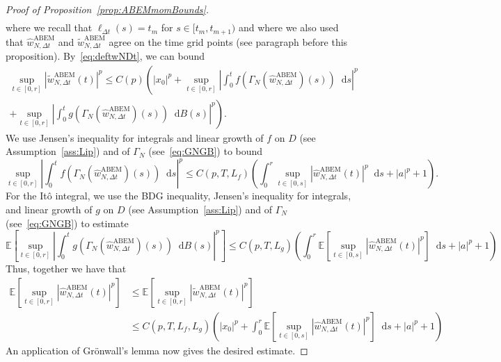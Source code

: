 \documentclass[11pt]{amsart}
\newcommand{\E}{{\mathbb E}}
\newcommand*\diff{\mathop{}\!\mathrm{d}}
\newcommand{\twNDt}{\tilde{w}_{N,\Delta t}}
\newcommand{\ABEM}{\textrm{ABEM}}
\begin{document}
{\begin{proof}[Proof of Proposition~\ref{prop:ABEMmomBounds}]
\begin{align*}
\end{align*}
where we recall that $\ell_{\Delta t}(s) = t_{m}$ for $s \in [t_{m},t_{m+1})$ and where we also used that $\hat{w}_{N,\Delta t}^{\ABEM}$ and $\tilde{w}^{\ABEM}_{N,\Delta t}$ agree on the time grid points (see paragraph before this proposition). By~\eqref{eq:deftwNDt}, we can bound 
\begin{multline*}
\sup_{t \in [0,r]} \left| \twNDt^{\ABEM}(t) \right|^{p} \leq C(p) \left( |x_{0}|^{p} + \sup_{t \in [0,r]} \left| \int_{0}^{t} f(\Gamma_{N}(\hat{w}_{N,\Delta t}^{\ABEM})(s)) \diff s \right|^{p} \right. \\ \left. + \sup_{t \in [0,r]} \left| \int_{0}^{t} g(\Gamma_{N}(\hat{w}_{N,\Delta t}^{\ABEM})(s)) \diff B(s) \right|^{p} \right).
\end{multline*}
We use Jensen's inequality for integrals and linear growth of $f$ on $D$ (see Assumption~\ref{ass:Lip}) and of $\Gamma_{N}$ (see~\eqref{eq:GNGB}) to bound
\begin{equation*}
\sup_{t \in [0,r]} \left| \int_{0}^{t} f(\Gamma_{N}(\hat{w}_{N,\Delta t}^{\ABEM})(s)) \diff s \right|^{p} \leq C(p,T,L_{f}) \left( \int_{0}^{r} \sup_{t \in [0,s]} \left| \hat{w}_{N,\Delta t}^{\ABEM}(t) \right|^{p} \diff s + |a|^{p} + 1 \right).
\end{equation*}
For the Itô integral, we use the BDG inequality, Jensen's inequality for integrals, and linear growth of $g$ on $D$ (see Assumption~\ref{ass:Lip}) and of $\Gamma_{N}$ (see~\eqref{eq:GNGB}) to estimate
\begin{equation*}
\E \left[ \sup_{t \in [0,r]} \left| \int_{0}^{t} g(\Gamma_{N}(\hat{w}_{N,\Delta t}^{\ABEM})(s)) \diff B(s) \right|^{p} \right] \leq C(p,T,L_{g}) \left( \int_{0}^{r} \E \left[ \sup_{t \in [0,s]} \left| \hat{w}_{N,\Delta t}^{\ABEM}(t) \right|^{p} \right] \diff s + |a|^{p} + 1 \right)
\end{equation*}
Thus, together we have that
\begin{align*}
\E \left[ \sup_{t \in [0,r]} \left| \hat{w}_{N,\Delta t}^{\ABEM}(t) \right|^{p} \right] &\leq \E \left[ \sup_{t \in [0,r]} \left| \twNDt^{\ABEM}(t) \right|^{p} \right] \\ &\leq C(p,T,L_{f},L_{g}) \left( |x_{0}|^{p} + \int_{0}^{r} \E \left[ \sup_{t \in [0,s]} \left| \hat{w}_{N,\Delta t}^{\ABEM}(t) \right|^{p} \right] \diff s + |a|^{p} + 1 \right)
\end{align*}
An application of Grönwall's lemma now gives the desired estimate.
\end{proof}

}
\end{document}
